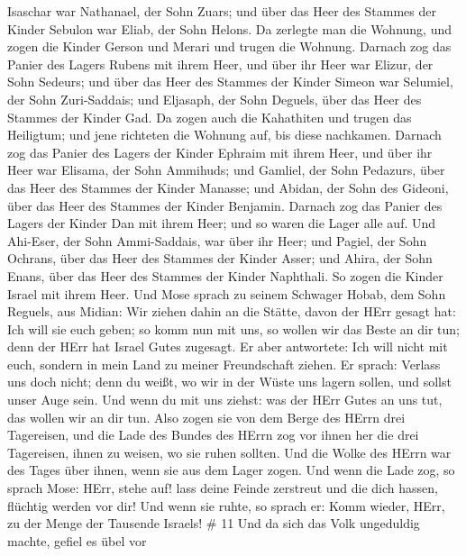 Isaschar war Nathanael, der Sohn Zuars;  und über das Heer
des Stammes der Kinder Sebulon war Eliab, der Sohn Helons. 
Da zerlegte man die Wohnung, und zogen die Kinder Gerson und Merari und
trugen die Wohnung.  Darnach zog das Panier des Lagers
Rubens mit ihrem Heer, und über ihr Heer war Elizur, der Sohn Sedeurs;
 und über das Heer des Stammes der Kinder Simeon war
Selumiel, der Sohn Zuri-Saddais;  und Eljasaph, der Sohn
Deguels, über das Heer des Stammes der Kinder Gad.  Da
zogen auch die Kahathiten und trugen das Heiligtum; und jene richteten
die Wohnung auf, bis diese nachkamen.  Darnach zog das
Panier des Lagers der Kinder Ephraim mit ihrem Heer, und über ihr Heer
war Elisama, der Sohn Ammihuds;  und Gamliel, der Sohn
Pedazurs, über das Heer des Stammes der Kinder Manasse; 
und Abidan, der Sohn des Gideoni, über das Heer des Stammes der Kinder
Benjamin.  Darnach zog das Panier des Lagers der Kinder Dan
mit ihrem Heer; und so waren die Lager alle auf. Und Ahi-Eser, der Sohn
Ammi-Saddais, war über ihr Heer;  und Pagiel, der Sohn
Ochrans, über das Heer des Stammes der Kinder Asser;  und
Ahira, der Sohn Enans, über das Heer des Stammes der Kinder Naphthali.
 So zogen die Kinder Israel mit ihrem Heer. 
Und Mose sprach zu seinem Schwager Hobab, dem Sohn Reguels, aus Midian:
Wir ziehen dahin an die Stätte, davon der HErr gesagt hat: Ich will sie
euch geben; so komm nun mit uns, so wollen wir das Beste an dir tun;
denn der HErr hat Israel Gutes zugesagt.  Er aber
antwortete: Ich will nicht mit euch, sondern in mein Land zu meiner
Freundschaft ziehen.  Er sprach: Verlass uns doch nicht;
denn du weißt, wo wir in der Wüste uns lagern sollen, und sollst unser
Auge sein.  Und wenn du mit uns ziehst: was der HErr Gutes
an uns tut, das wollen wir an dir tun.  Also zogen sie von
dem Berge des HErrn drei Tagereisen, und die Lade des Bundes des HErrn
zog vor ihnen her die drei Tagereisen, ihnen zu weisen, wo sie ruhen
sollten.  Und die Wolke des HErrn war des Tages über ihnen,
wenn sie aus dem Lager zogen.  Und wenn die Lade zog, so
sprach Mose: HErr, stehe auf! lass deine Feinde zerstreut und die dich
hassen, flüchtig werden vor dir!  Und wenn sie ruhte, so
sprach er: Komm wieder, HErr, zu der Menge der Tausende Israels! \# 11
 Und da sich das Volk ungeduldig machte, gefiel es übel vor
